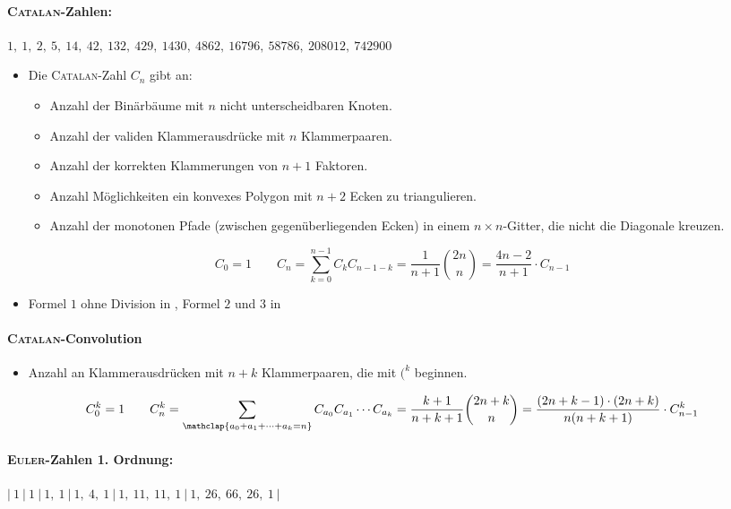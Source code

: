 \paragraph{\textsc{Catalan}-Zahlen:}
$1,~1,~2,~5,~14,~42,~132,~429,~1430,~4862,~16796,~58786,~208012,~742900$
\begin{itemize}
	\item Die \textsc{Catalan}-Zahl $C_n$ gibt an:
	\begin{itemize}
		\item Anzahl der Binärbäume mit $n$ nicht unterscheidbaren Knoten.
		\item Anzahl der validen Klammerausdrücke mit $n$ Klammerpaaren.
		\item Anzahl der korrekten Klammerungen von $n+1$ Faktoren.
		\item Anzahl Möglichkeiten ein konvexes Polygon mit $n + 2$ Ecken zu triangulieren.
		\item Anzahl der monotonen Pfade (zwischen gegenüberliegenden Ecken) in
		einem $n \times n$-Gitter, die nicht die Diagonale kreuzen.
	\end{itemize}
\end{itemize}
\[C_0 = 1\qquad C_n = \sum\limits_{k = 0}^{n - 1} C_kC_{n - 1 - k} =
\frac{1}{n + 1}\binom{2n}{n} = \frac{4n - 2}{n+1} \cdot C_{n-1}\]
\begin{itemize}
	\item Formel $1$ ohne Division in , Formel $2$ und $3$ in 
\end{itemize}

\vfill\null\columnbreak

\paragraph{\textsc{Catalan}-Convolution}
\begin{itemize}
	\item Anzahl an Klammerausdrücken mit $n+k$ Klammerpaaren, die mit $\texttt{(}^k$ beginnen.
\end{itemize}
\[C^k_0 = 1\qquad C^k_n = \sum\limits_{\mathclap{a_0+a_1+\dots+a_k=n}} C_{a_0}C_{a_1}\cdots C_{a_k} =
\frac{k+1}{n+k+1}\binom{2n+k}{n} = \frac{(2n+k-1)\cdot(2n+k)}{n(n+k+1)} \cdot C^k_{n-1}\]

\paragraph{\textsc{Euler}-Zahlen 1. Ordnung:}
$|~1~|~1~|~1,~1~|~1,~4,~1~|~1,~11,~11,~1~|~1,~26,~66,~26,~1~|$

